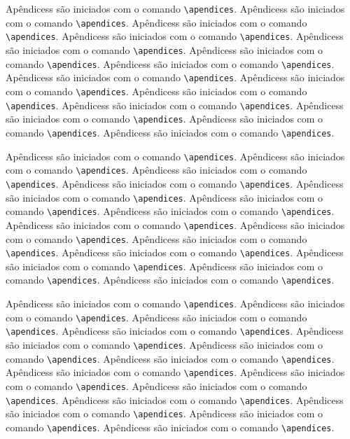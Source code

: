Apêndicess são iniciados com o comando \verb|\apendices|.
Apêndicess são iniciados com o comando \verb|\apendices|.
Apêndicess são iniciados com o comando \verb|\apendices|.
Apêndicess são iniciados com o comando \verb|\apendices|.
Apêndicess são iniciados com o comando \verb|\apendices|.
Apêndicess são iniciados com o comando \verb|\apendices|.
Apêndicess são iniciados com o comando \verb|\apendices|.
Apêndicess são iniciados com o comando \verb|\apendices|.
Apêndicess são iniciados com o comando \verb|\apendices|.
Apêndicess são iniciados com o comando \verb|\apendices|.
Apêndicess são iniciados com o comando \verb|\apendices|.
Apêndicess são iniciados com o comando \verb|\apendices|.
Apêndicess são iniciados com o comando \verb|\apendices|.
Apêndicess são iniciados com o comando \verb|\apendices|.

Apêndicess são iniciados com o comando \verb|\apendices|.
Apêndicess são iniciados com o comando \verb|\apendices|.
Apêndicess são iniciados com o comando \verb|\apendices|.
Apêndicess são iniciados com o comando \verb|\apendices|.
Apêndicess são iniciados com o comando \verb|\apendices|.
Apêndicess são iniciados com o comando \verb|\apendices|.
Apêndicess são iniciados com o comando \verb|\apendices|.
Apêndicess são iniciados com o comando \verb|\apendices|.
Apêndicess são iniciados com o comando \verb|\apendices|.
Apêndicess são iniciados com o comando \verb|\apendices|.
Apêndicess são iniciados com o comando \verb|\apendices|.
Apêndicess são iniciados com o comando \verb|\apendices|.
Apêndicess são iniciados com o comando \verb|\apendices|.
Apêndicess são iniciados com o comando \verb|\apendices|.

Apêndicess são iniciados com o comando \verb|\apendices|.
Apêndicess são iniciados com o comando \verb|\apendices|.
Apêndicess são iniciados com o comando \verb|\apendices|.
Apêndicess são iniciados com o comando \verb|\apendices|.
Apêndicess são iniciados com o comando \verb|\apendices|.
Apêndicess são iniciados com o comando \verb|\apendices|.
Apêndicess são iniciados com o comando \verb|\apendices|.
Apêndicess são iniciados com o comando \verb|\apendices|.
Apêndicess são iniciados com o comando \verb|\apendices|.
Apêndicess são iniciados com o comando \verb|\apendices|.
Apêndicess são iniciados com o comando \verb|\apendices|.
Apêndicess são iniciados com o comando \verb|\apendices|.
Apêndicess são iniciados com o comando \verb|\apendices|.
Apêndicess são iniciados com o comando \verb|\apendices|.

